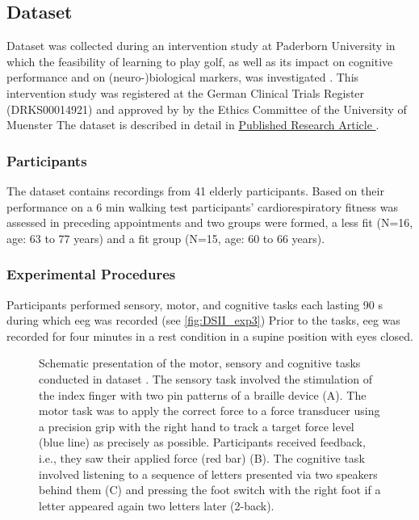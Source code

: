 \subsection{Dataset }
\label{methods:datasets:III}
Dataset  was collected during an intervention study at Paderborn University in which the feasibility of learning to play golf, as well as its impact on cognitive performance and on (neuro-)biological markers, was investigated \cite{Ströhlein2020,Stroehlein2021,Gowik2023}. This intervention study was registered at the German Clinical Trials Register (DRKS00014921) and approved by by the Ethics Committee of the University of Muenster The dataset is described in detail in \hyperref[pub:paperIII]{Published Research Article }. 

\subsubsection{Participants}
\label{methods:datasets:III:participants}
The dataset contains recordings from 41 elderly participants. Based on their performance on a 6 min walking test participants’ cardiorespiratory fitness was assessed in preceding appointments and two groups were formed, a less fit (N=16, age: 63 to 77 years) and a fit group (N=15, age: 60 to 66 years).

\subsubsection{Experimental Procedures}
\label{methods:datasets:II:experiment}
Participants performed sensory, motor, and cognitive tasks each lasting 90 s during which \gls{eeg} was recorded (see \autoref{fig:DSII_exp3}) Prior to the tasks, \gls{eeg} was recorded for four minutes in a rest condition in a supine position with eyes closed.

\begin{figure}[h]
\begin{center}

\caption[Schematic presentation of the motor, sensory and cognitive tasks conducted in dataset .]{Schematic presentation of the motor, sensory and cognitive tasks conducted in dataset . The sensory task involved the stimulation of the index finger with two pin patterns of a braille device (A). The motor task was to apply the correct force to a force transducer using a precision grip with the right hand to track a target force level (blue line) as precisely as possible. Participants received feedback, i.e., they saw their applied force (red bar) (B). The cognitive task involved listening to a sequence of letters presented via two speakers behind them (C) and pressing the foot switch with the right foot if a letter appeared again two letters later (2-back).}
\label{fig:DSII_exp3}
\end{center}
\end{figure}

